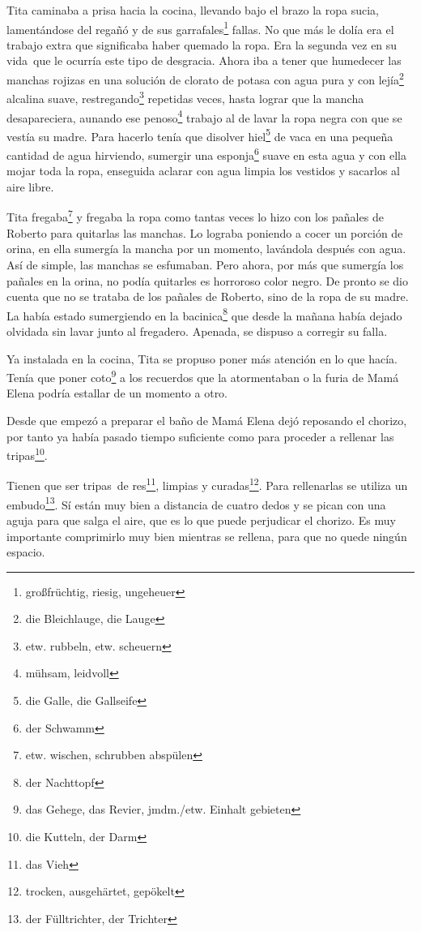 Tita caminaba a prisa hacia la cocina, llevando bajo el brazo la ropa
sucia, lamentándose del regañó y de sus garrafales\footnote{großfrüchtig, riesig, ungeheuer}
fallas. No que más le dolía era el trabajo extra que significaba haber
quemado la ropa. Era la segunda vez en su vida~que le ocurría este
tipo de desgracia. Ahora iba a tener que humedecer las manchas rojizas
en una solución de clorato de potasa con agua pura y con lejía\footnote{die Bleichlauge, die Lauge}
alcalina suave, restregando\footnote{etw. rubbeln, etw. scheuern}
repetidas veces, hasta lograr que la mancha desapareciera,
aunando ese penoso\footnote{mühsam, leidvoll} trabajo al de lavar la ropa negra
con que se vestía su madre. Para hacerlo tenía que disolver hiel\footnote{die Galle, die Gallseife}
de vaca en una pequeña cantidad de agua hirviendo, sumergir una esponja\footnote{der Schwamm}
suave en esta agua y con ella mojar toda la ropa, enseguida aclarar
con agua limpia los vestidos y sacarlos al aire libre.

Tita fregaba\footnote{etw. wischen, schrubben abspülen} y fregaba
la ropa como tantas veces lo hizo con los pañales de Roberto para
quitarlas las manchas. Lo lograba poniendo a
cocer un porción de orina, en ella sumergía la mancha por un momento,
lavándola después con agua. Así de simple, las manchas se esfumaban.
Pero ahora, por más que sumergía los pañales en la orina, no podía
quitarles es horroroso color negro. De pronto se dio cuenta que no se
trataba de los pañales de Roberto, sino de la ropa de su madre. La había
estado sumergiendo en la bacinica\footnote{der Nachttopf} que
desde la mañana había dejado olvidada sin lavar junto al fregadero.
Apenada, se dispuso a corregir su falla.

Ya instalada en la cocina, Tita se propuso poner más atención en lo que
hacía. Tenía que poner coto\footnote{das Gehege, das Revier, jmdm./etw. Einhalt gebieten}
a los recuerdos que la atormentaban o la furia de Mamá Elena podría
estallar de un momento a otro.

Desde que empezó a preparar el baño de Mamá Elena dejó reposando el
chorizo, por tanto ya había pasado tiempo suficiente como para proceder
a rellenar las tripas\footnote{die Kutteln, der Darm}.

Tienen que ser tripas~de res\footnote{das Vieh}, limpias y curadas\footnote{trocken, ausgehärtet, gepökelt}. Para rellenarlas
se utiliza un embudo\footnote{der Fülltrichter, der Trichter}.
Sí están muy bien a distancia de cuatro dedos y se pican con una aguja
para que salga el aire, que es lo que puede perjudicar el chorizo. Es
muy importante comprimirlo muy bien mientras se rellena, para que no quede
ningún espacio.

